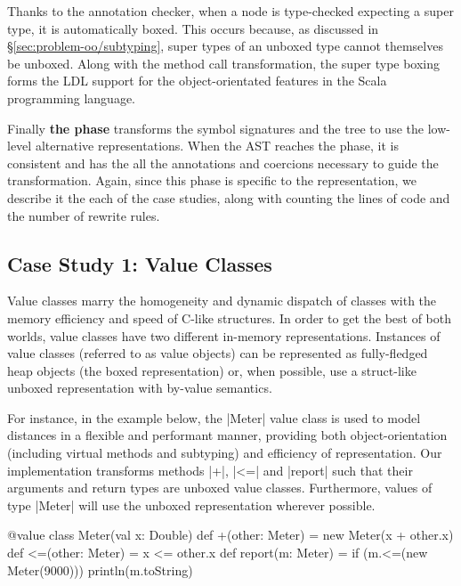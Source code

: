 Thanks to the annotation checker, when a node is type-checked expecting a super type, it is automatically boxed. This occurs because, as discussed in \S\ref{sec:problem-oo/subtyping}, super types of an unboxed type cannot themselves be unboxed. Along with the method call transformation, the super type boxing forms the LDL support for the object-orientated features in the Scala programming language.

Finally \textbf{the \commit{} phase} transforms the symbol signatures and the tree to use the low-level alternative representations. When the AST reaches the \commit{} phase, it is consistent and has the all the annotations and coercions necessary to guide the transformation. Again, since this phase is specific to the representation, we describe it the each of the case studies, along with counting the lines of code and the number of rewrite rules.

\subsection{Case Study 1: Value Classes}
\label{sec:validation/value-classes}

Value classes \cite{gosling-value-classes, dot-net-value-types-www, scala-value-classes-sip} marry the homogeneity and dynamic dispatch of classes with the memory efficiency and speed of C-like structures. In order to get the best of both worlds, value classes have two different in-memory representations. Instances of value classes (referred to as value objects) can be represented as fully-fledged heap objects (the boxed representation) or, when possible, use a struct-like unboxed representation with by-value semantics.

For instance, in the example below, the |Meter| value class is used to model distances in a flexible and performant manner, providing both object-orientation (including virtual methods and subtyping) and efficiency of representation. Our implementation transforms methods |+|, |<=| and |report| such that their arguments and return types are unboxed value classes. Furthermore, values of type |Meter| will use the unboxed representation wherever possible.

\begin{lstlisting-nobreak}
 @value class Meter(val x: Double) {
   def +(other: Meter) = new Meter(x + other.x)
   def <=(other: Meter) = x <= other.x
 }
 def report(m: Meter) = {
   if (m.<=(new Meter(9000)))
     println(m.toString)
 }
\end{lstlisting-nobreak}

